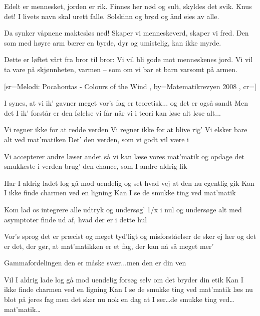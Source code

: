 \documentclass[pdftex,12pt]{article}
\begin{document}
\begin{songs}{}
\beginverse
Edelt er mennesket,
jorden er rik.
 Finnes her nød og sult,
skyldes det svik.
 Knus det! I livets navn
skal urett falle.
 Solskinn og brød og ånd
eies av alle.
\endverse

\beginverse
Da synker våpnene
maktesløs ned!
 Skaper vi menneskeverd,
skaper vi fred.
 Den som med høyre arm
bærer en byrde,
 dyr og umistelig,
kan ikke myrde.
\endverse

\beginverse

Dette er løftet vårt
fra bror til bror:
 Vi vil bli gode mot
menneskenes jord.
 Vi vil ta vare på
skjønnheten, varmen –
 som om vi bar et barn
varsomt på armen.
\endverse
\endsong



﻿[sr={Melodi: Pocahontas - Colours of the Wind}
,
by={Matematikrevyen 2008}
,
cr={}]\hypertarget{Smukke ting ved mat'matik}{}
\label{song85}

\beginverse
I synes, at vi ik' gavner meget
vor's fag er teoretisk...
\hspace{5em}og det er også sandt
Men det I ik' forstår
er den følelse vi får
når vi i teori kan løse alt
løse alt...

\endverse
\beginverse
Vi regner ikke for at redde verden
Vi regner ikke for at blive rig'
Vi elsker bare alt ved mat'matiken
Det' den verden, som vi godt vil være i

\endverse
\beginverse
Vi accepterer andre læser andet
så vi kan læse vores mat'matik
og opdage det smukkeste i verden
brug' den chance, som I andre aldrig fik

\endverse
\beginverse
Har I aldrig ladet log gå mod uendelig
og set hvad vej at den nu egentlig gik
Kan I ikke finde charmen ved en ligning
Kan I se de smukke ting ved mat'matik

\endverse
\beginverse
Kom lad os integrere alle udtryk
og undersøg' 1/x i nul
og undersøge alt med asymptoter
finde ud af, hvad der er i dette hul

\endverse
\beginverse
Vor's sprog det er præcist og meget tyd'ligt
og misforståelser de sker ej her
og det er det, der gør, at mat'matikken
er et fag, der kan nå så meget mer'

\endverse
\beginverse
Gammafordelingen
den er måske svær...men den er din ven

\endverse
\beginverse
Vil I aldrig lade log gå mod uendelig
forsøg selv om det bryder din etik
Kan I ikke finde charmen ved en ligning
Kan I se de smukke ting ved mat'matik
læs nu blot på jeres fag
men det sker nu nok en dag
at I ser\ldots de smukke ting ved\ldots mat'matik\ldots


\end{songs}
\end{document}
